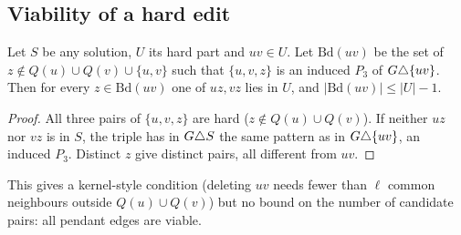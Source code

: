 \subsection{Viability of a hard edit}
\begin{lemma}\label{lem:viab}
Let $S$ be any solution, $U$ its hard part and $uv\in U$. Let $\mathrm{Bd}(uv)$ be the set of $z\notin Q(u)\cup Q(v)\cup\{u,v\}$ such that $\{u,v,z\}$ is an induced $P_3$ of $G\triangle\{uv\}$. Then for every $z\in\mathrm{Bd}(uv)$ one of $uz,vz$ lies in $U$, and $|\mathrm{Bd}(uv)|\le|U|-1$.
\end{lemma}
\begin{proof}
All three pairs of $\{u,v,z\}$ are hard ($z\notin Q(u)\cup Q(v)$). If neither $uz$ nor $vz$ is in $S$, the triple has in $G\triangle S$ the same pattern as in $G\triangle\{uv\}$, an induced $P_3$. Distinct $z$ give distinct pairs, all different from $uv$.
\end{proof}
This gives a kernel-style condition (deleting $uv$ needs fewer than $\ell$ common neighbours outside $Q(u)\cup Q(v)$) but no bound on the number of candidate pairs: all pendant edges are viable.

